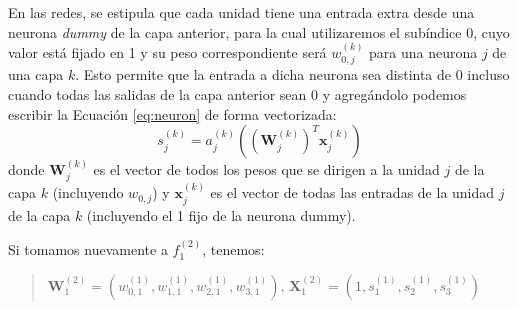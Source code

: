 \documentclass[../../main.tex]{subfiles}
\begin{document}
En las redes, se estipula que cada unidad tiene una entrada extra desde una neurona
\textit{dummy} de la capa anterior, para la cual utilizaremos el subíndice 0, cuyo valor
está fijado en 1 y su peso correspondiente será \(w^{(k)}_{0,j}\) para una neurona \(j\)
de una capa \(k\)\footnotemark. Esto permite que la entrada a dicha neurona sea distinta de 0
incluso cuando todas las salidas de la capa anterior sean 0 \cite{ai-a-modern-approach} y
agregándolo podemos escribir la Ecuación \ref{eq:neuron} de forma vectorizada:
\begin{equation}
    s^{(k)}_j = a^{(k)}_j \left( \left( \mathbf{W}^{(k)}_j \right)^T \mathbf{x}^{(k)}_j \right)
\end{equation}
donde \(\mathbf{W}^{(k)}_j\) es el vector de todos los pesos que se dirigen a la unidad \(j\) de
la capa \(k\) (incluyendo \(w_{0,j}\)) y \(\mathbf{x}^{(k)}_j\) es el vector de todas las entradas
de la unidad \(j\) de la capa \(k\) (incluyendo el 1 fijo de la neurona dummy).


Si tomamos nuevamente a \(f^{(2)}_1\), tenemos:
\begin{quote}
    \(\mathbf{W}^{(2)}_1 = (w^{(1)}_{0,1}, w^{(1)}_{1,1}, w^{(1)}_{2,1}, w^{(1)}_{3,1})\),
    \(\mathbf{X}^{(2)}_1 = (1, s^{(1)}_1, s^{(1)}_2, s^{(1)}_3)\)
\end{quote}
\end{document}
